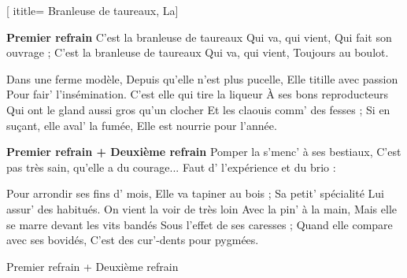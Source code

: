[
ititle= {Branleuse de taureaux, La}]

\beginchorus
\textbf {Premier refrain}
C'est la branleuse de taureaux
Qui va, qui vient,
Qui fait son ouvrage ;
C'est la branleuse de taureaux
Qui va, qui vient,
Toujours au boulot.
\endchorus

\beginverse
Dans une ferme modèle,
Depuis qu'elle n'est plus pucelle,
Elle titille avec passion
Pour fair' l'insémination.
C'est elle qui tire la liqueur
À ses bons reproducteurs
Qui ont le gland aussi gros qu'un clocher
Et les claouis comm' des fesses ;
Si en suçant, elle aval' la fumée,
Elle est nourrie pour l'année.
\endverse

\beginchorus
\textbf {Premier refrain
+
Deuxième refrain}
Pomper la s'menc' à ses bestiaux,
C'est pas très sain, qu'elle a du courage...
Faut d' l'expérience et du brio :
\endchorus

\beginverse
Pour arrondir ses fins d' mois,
Elle va tapiner au bois ;
Sa petit' spécialité
Lui assur' des habitués.
On vient la voir de très loin
Avec la pin' à la main,
Mais elle se marre devant les vits bandés
Sous l'effet de ses caresses ;
Quand elle compare avec ses bovidés,
C'est des cur'-dents pour pygmées.
\endverse

\beginchorus
Premier refrain + Deuxième refrain
\endchorus

\endsong